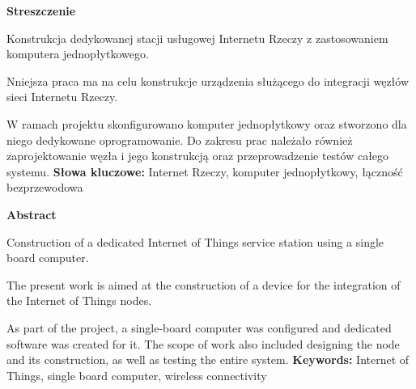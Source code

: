 \documentclass[12pt, twoside, openany]{mwrep}
\begin{document}
\thispagestyle{empty}
\newpage
{}

\newpage
\setcounter{page}{1}

\thispagestyle{empty}
\centerline{\bf Streszczenie}
\centerline\textit{}
Konstrukcja dedykowanej stacji usługowej Internetu Rzeczy z zastosowaniem komputera jednopłytkowego.
   \hfill \break
	\par Nniejsza praca ma na celu konstrukcje urządzenia służącego do integracji węzłów sieci Internetu Rzeczy. 
	\par W ramach projektu skonfigurowano komputer  jednopłytkowy oraz stworzono dla niego dedykowane oprogramowanie. Do zakresu prac należało również zaprojektowanie węzła i jego konstrukcją oraz przeprowadzenie testów całego systemu.
   \hfill \break
   \hfill \break
\textbf{Słowa kluczowe:} Internet Rzeczy, komputer jednopłytkowy, łączność bezprzewodowa
\clearpage
\thispagestyle{empty}
\centerline{\bf Abstract}
\centerline\textit{}
Construction of a dedicated Internet of Things service station using a single board computer.
   \hfill \break
	\par The present work is aimed at the construction of a device for the integration of the Internet of Things nodes. 
	\par As part of the project, a single-board computer was configured and dedicated software was created for it. The scope of work also included designing the node and its construction, as well as testing the entire system.
   \hfill \break
   \hfill \break
\textbf{Keywords:} Internet of Things, single board computer, wireless connectivity
\newpage
\thispagestyle{empty}
\end{document}
